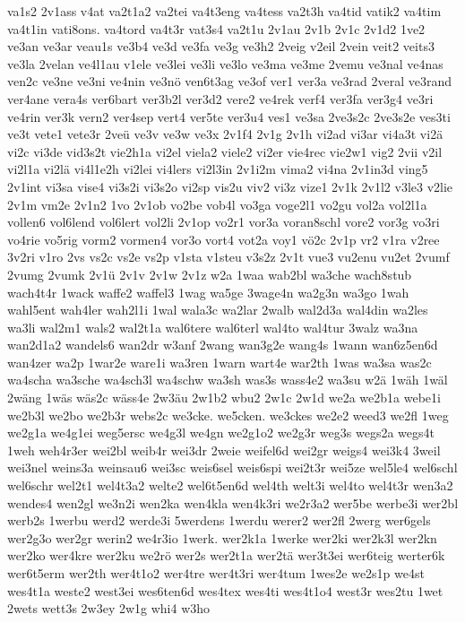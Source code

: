{va1s2
2v1ass
v4at
va2t1a2
va2tei
va4t3eng
va4tess
va2t3h
va4tid
vatik2
va4tim
va4t1in
vati8ons.
va4tord
va4t3r
vat3s4
va2t1u
2v1au
2v1b
2v1c
2v1d2
1ve2
ve3an
ve3ar
veau1s
ve3b4
ve3d
ve3fa
ve3g
ve3h2
2veig
v2eil
2vein
veit2
veits3
ve3la
2velan
ve4l1au
v1ele
ve3lei
ve3li
ve3lo
ve3ma
ve3me
2vemu
ve3nal
ve4nas
ven2c
ve3ne
ve3ni
ve4nin
ve3nö
ven6t3ag
ve3of
ver1
ver3a
ve3rad
2veral
ve3rand
ver4ane
vera4s
ver6bart
ver3b2l
ver3d2
vere2
ve4rek
verf4
ver3fa
ver3g4
ve3ri
ve4rin
ver3k
vern2
ver4sep
vert4
ver5te
ver3u4
ves1
ve3sa
2ve3s2c
2ve3s2e
ves3ti
ve3t
vete1
vete3r
2veü
ve3v
ve3w
ve3x
2v1f4
2v1g
2v1h
vi2ad
vi3ar
vi4a3t
vi2ä
vi2c
vi3de
vid3s2t
vie2h1a
vi2el
viela2
viele2
vi2er
vie4rec
vie2w1
vig2
2vii
v2il
vi2l1a
vi2lä
vi4l1e2h
vi2lei
vi4lers
vi2l3in
2v1i2m
vima2
vi4na
2v1in3d
ving5
2v1int
vi3sa
vise4
vi3s2i
vi3s2o
vi2sp
vis2u
viv2
vi3z
vize1
2v1k
2v1l2
v3le3
v2lie
2v1m
vm2e
2v1n2
1vo
2v1ob
vo2be
vob4l
vo3ga
voge2l1
vo2gu
vol2a
vol2l1a
vollen6
vol6lend
vol6lert
vol2li
2v1op
vo2r1
vor3a
voran8schl
vore2
vor3g
vo3ri
vo4rie
vo5rig
vorm2
vormen4
vor3o
vort4
vot2a
voy1
vö2c
2v1p
vr2
v1ra
v2ree
3v2ri
v1ro
2vs
vs2c
vs2e
vs2p
v1sta
v1steu
v3s2z
2v1t
vue3
vu2enu
vu2et
2vumf
2vumg
2vumk
2v1ü
2v1v
2v1w
2v1z
w2a
1waa
wab2bl
wa3che
wach8stub
wach4t4r
1wack
waffe2
waffel3
1wag
wa5ge
3wage4n
wa2g3n
wa3go
1wah
wahl5ent
wah4ler
wah2l1i
1wal
wala3c
wa2lar
2walb
wal2d3a
wal4din
wa2les
wa3li
wal2m1
wals2
wal2t1a
wal6tere
wal6terl
wal4to
wal4tur
3walz
wa3na
wan2d1a2
wandels6
wan2dr
w3anf
2wang
wan3g2e
wang4s
1wann
wan6z5en6d
wan4zer
wa2p
1war2e
ware1i
wa3ren
1warn
wart4e
war2th
1was
wa3sa
was2c
wa4scha
wa3sche
wa4sch3l
wa4schw
wa3sh
was3s
wass4e2
wa3su
w2ä
1wäh
1wäl
2wäng
1wäs
wäs2c
wäss4e
2w3äu
2w1b2
wbu2
2w1c
2w1d
we2a
we2b1a
webe1i
we2b3l
we2bo
we2b3r
webs2c
we3cke.
we5cken.
we3ckes
we2e2
weed3
we2fl
1weg
we2g1a
we4g1ei
weg5ersc
we4g3l
we4gn
we2g1o2
we2g3r
weg3s
wegs2a
wegs4t
1weh
weh4r3er
wei2bl
weib4r
wei3dr
2weie
weifel6d
wei2gr
weigs4
wei3k4
3weil
wei3nel
weins3a
weinsau6
wei3sc
weis6sel
weis6spi
wei2t3r
wei5ze
wel5le4
wel6schl
wel6schr
wel2t1
wel4t3a2
welte2
wel6t5en6d
wel4th
welt3i
wel4to
wel4t3r
wen3a2
wendes4
wen2gl
we3n2i
wen2ka
wen4kla
wen4k3ri
we2r3a2
wer5be
werbe3i
wer2bl
werb2s
1werbu
werd2
werde3i
5werdens
1werdu
werer2
wer2fl
2werg
wer6gels
wer2g3o
wer2gr
werin2
we4r3io
1werk.
wer2k1a
1werke
wer2ki
wer2k3l
wer2kn
wer2ko
wer4kre
wer2ku
we2rö
wer2s
wer2t1a
wer2tä
wer3t3ei
wer6teig
werter6k
wer6t5erm
wer2th
wer4t1o2
wer4tre
wer4t3ri
wer4tum
1wes2e
we2s1p
we4st
wes4t1a
weste2
west3ei
wes6ten6d
wes4tex
wes4ti
wes4t1o4
west3r
wes2tu
1wet
2wets
wett3s
2w3ey
2w1g
whi4
w3ho
}

